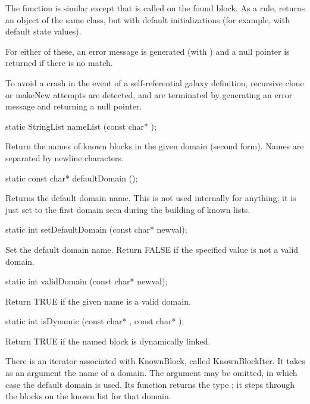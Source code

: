 The  function is similar except that 
is called on the found block.  As a rule,  returns
an object of the same class, but with default initializations
(for example, with default state values).

For either of these, an error message is generated (with
) and a null pointer is returned if there is no
match.

To avoid a crash in the event of a self-referential galaxy definition,
recursive clone or makeNew attempts are detected, and are terminated by
generating an error message and returning a null pointer.

\begin{example}
static StringList nameList (const char* );
\end{example}

Return the names of known blocks in
the given domain (second form).  Names are
separated by newline characters.

\begin{example}
static const char* defaultDomain ();
\end{example}

Returns the default domain name.  This is
not used internally for anything; it is just set to the first domain
seen during the building of known lists.

\begin{example}
static int setDefaultDomain (const char* newval);
\end{example}

Set the default domain name.  Return FALSE if
the specified value is not a valid domain.

\begin{example}
static int validDomain (const char* newval);
\end{example}

Return TRUE if the given name is a valid domain.

\begin{example}
static int isDynamic (const char* , const char* );
\end{example}

Return TRUE if the named block is dynamically linked.

There is an iterator associated with KnownBlock, called
KnownBlockIter.  It takes as an argument the name of a domain.  The
argument may be omitted, in which case the default domain is used.
Its  function returns the type ; it
steps through the blocks on the known list for that domain.

